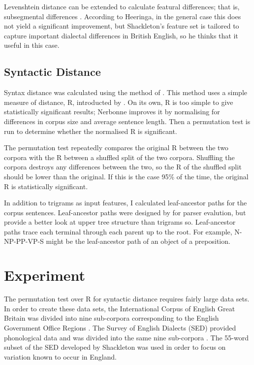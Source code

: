 \documentclass[11pt]{article}
\begin{document}
Levenshtein distance can be extended to calculate featural
differences; that is, subsegmental differences
\cite{heeringa04}. According to Heeringa, in
the general case this does not yield a significant improvement, but
Shackleton's feature set is tailored to capture important dialectal
differences in British English, so he thinks that it useful in this
case. %

\subsection{Syntactic Distance}
Syntax distance was calculated using the method of
. This method uses a simple measure of distance,
R, introducted by . On its own, R is too simple to
give statistically significant results; Nerbonne improves it by
normalising for differences in corpus size and average sentence
length. Then a permutation test is run to determine whether the
normalised R is significant.

The permutation test repeatedly compares the original R between the two corpora
with the R between a shuffled split of the two corpora. Shuffling the
corpora destroys any differences between the two, so the R of the
shuffled split should be lower than the original. If this is the case
95\% of the time, the original R is statistically significant.

In addition to trigrams as input features, I calculated leaf-ancestor
paths for the corpus sentences. Leaf-ancestor paths were designed by
 for parser evalution, but provide a better look at
upper tree structure than trigrams so. Leaf-ancestor paths trace each
terminal through each parent up to the root. For example,
N-NP-PP-VP-S might be the leaf-ancestor path of an object of a preposition.
\section{Experiment}

The permutation test over R for syntactic distance requires fairly
large data sets. In order to create these data sets, the International
Corpus of English Great Britain was divided into nine sub-corpora
corresponding to the English Government Office Regions
\cite{nelson02}. The Survey of English Dialects (SED) provided phonological
data and was divided into the same nine sub-corpora
\cite{orton63}. The 55-word subset of the SED developed
by Shackleton was used in order to focus on variation known to occur
in England.
\end{document}
